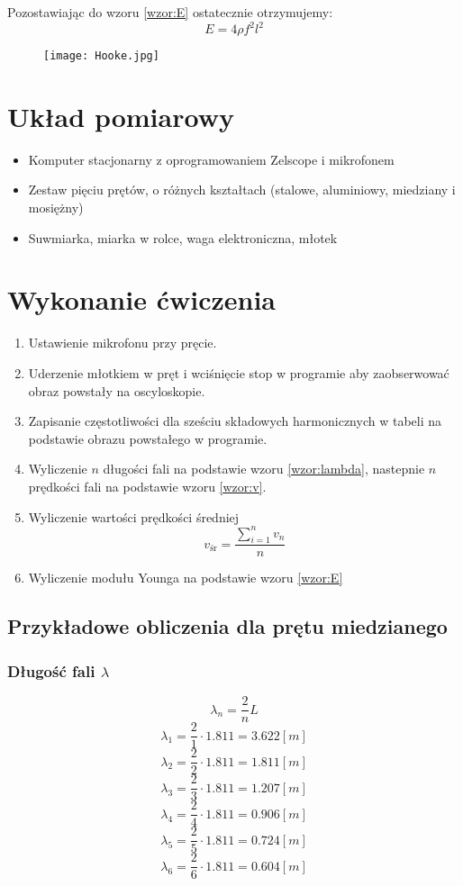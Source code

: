 \documentclass[a4paper,11pt]{article}
\begin{document}
Pozostawiając do wzoru {\ref{wzor:E}} ostatecznie otrzymujemy:
$$E = 4\rho f^2 l^2$$
 \begin{figure}
 \label{fig:my_label}
 \texttt{[image: Hooke.jpg]} 
 \end{figure}
 
 
\section{Układ pomiarowy}
\begin{itemize}
\item Komputer stacjonarny z oprogramowaniem Zelscope i mikrofonem
\item Zestaw pięciu prętów, o różnych kształtach (stalowe, aluminiowy, miedziany i mosiężny)
\item Suwmiarka, miarka w rolce, waga elektroniczna, młotek
\end{itemize}

\section{Wykonanie ćwiczenia}
 \begin{enumerate}
 \item Ustawienie mikrofonu przy pręcie.
 \item Uderzenie młotkiem w pręt i wciśnięcie stop w programie aby zaobserwować obraz powstały na oscyloskopie.
 \item Zapisanie częstotliwości dla sześciu składowych harmonicznych w tabeli na podstawie obrazu powstałego w programie.
 \item Wyliczenie $n$ długości fali na podstawie wzoru {\ref{wzor:lambda}}, nastepnie $n$ prędkości fali na podstawie wzoru  {\ref{wzor:v}}.
 \item Wyliczenie wartości prędkości średniej 
 $$ v_{\text{śr}} = \frac{\sum^{n}_{i=1}v_{n}}{n}$$
 \item Wyliczenie modułu Younga na podstawie wzoru {\ref{wzor:E}}
 \end{enumerate}
 
 \subsection{Przykładowe obliczenia dla prętu miedzianego}
 \subsubsection{Długość fali $\lambda$}
 \begin{equation}
	\lambda_{n} = \frac{2}{n}L
\end{equation}
 $$ \lambda_{1} = \frac{2}{1}\cdot 1.811 = 3.622 [m]$$
 $$ \lambda_{2} = \frac{2}{2}\cdot 1.811 = 1.811 [m]$$
 $$ \lambda_{3} = \frac{2}{3}\cdot 1.811 = 1.207 [m]$$
 $$ \lambda_{4} = \frac{2}{4}\cdot 1.811 = 0.906 [m]$$
 $$ \lambda_{5} = \frac{2}{5}\cdot 1.811 = 0.724 [m]$$
 $$ \lambda_{6} = \frac{2}{6}\cdot 1.811 = 0.604 [m]$$
 
\end{document}
